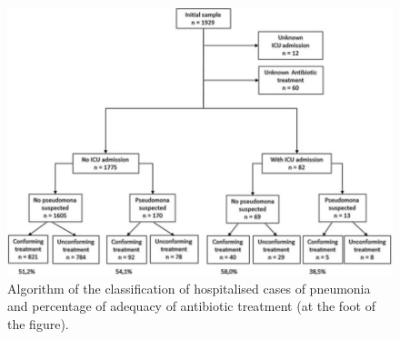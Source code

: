 \documentclass[11pt, a4paper]{article}
\begin{document}
\begin{figure}[hbt!]
\begin{center}
\includegraphics[scale=.7]{algoritmo_casos.jpg}
\caption{\footnotesize Algorithm of the classification of hospitalised cases of pneumonia and percentage of adequacy of antibiotic treatment (at the foot of the figure).}
\label{fig:algoritmo}
\end{center}
\end{figure}
\end{document}
